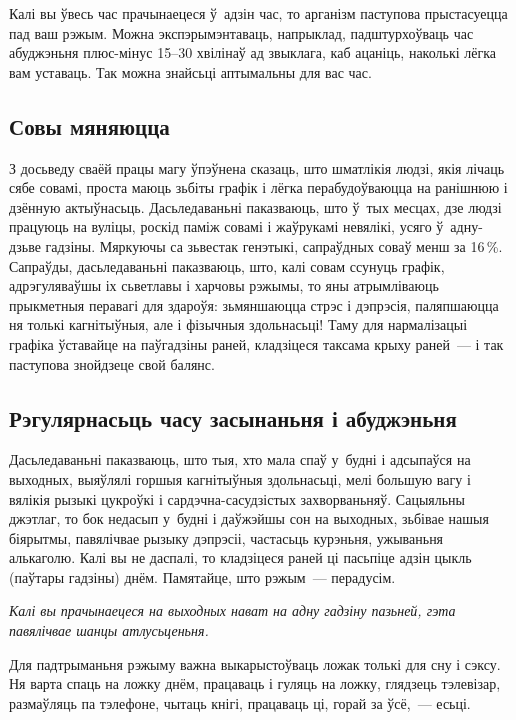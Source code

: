 Калі вы ўвесь час прачынаецеся ў~адзін час, то арганізм паступова прыстасуецца пад ваш рэжым. Можна экспэрымэнтаваць, напрыклад, падштурхоўваць час абуджэньня плюс-мінус 15--30 хвілінаў ад звыклага, каб ацаніць, наколькі лёгка вам уставаць. Так можна знайсьці аптымальны для вас час.

\subsection*{Совы мяняюцца}

З досьведу сваёй працы магу ўпэўнена сказаць, што шматлікія людзі, якія лічаць сябе совамі, проста маюць зьбіты графік і лёгка перабудоўваюцца на ранішнюю і дзённую актыўнасьць. Дасьледаваньні паказваюць, што ў~тых месцах, дзе людзі працуюць на вуліцы, роскід паміж совамі і жаўрукамі невялікі, усяго ў~адну-дзьве гадзіны. Мяркуючы са зьвестак генэтыкі, сапраўдных соваў менш за 16\,\%. Сапраўды, дасьледаваньні паказваюць, што, калі совам ссунуць графік, адрэгуляваўшы іх сьветлавы і харчовы рэжымы, то яны атрымліваюць прыкметныя перавагі для здароўя: зьмяншаюцца стрэс і дэпрэсія, паляпшаюцца ня толькі кагнітыўныя, але і фізычныя здольнасьці! Таму для нармалізацыі графіка ўставайце на паўгадзіны раней, кладзіцеся таксама крыху раней~--- і так паступова знойдзеце свой балянс.


\subsection*{Рэгулярнасьць часу засынаньня і абуджэньня}

Дасьледаваньні паказваюць, што тыя, хто мала спаў у~будні і адсыпаўся на выходных, выяўлялі горшыя кагнітыўныя здольнасьці, мелі большую вагу і вялікія рызыкі цукроўкі і сардэчна-сасудзістых захворваньняў. Сацыяльны джэтлаг, то бок недасып у~будні і даўжэйшы сон на выходных, зьбівае нашыя біярытмы, павялічвае рызыку дэпрэсіі, частасьць курэньня, ужываньня алькаголю. Калі вы не даспалі, то кладзіцеся раней ці пасьпіце адзін цыкль (паўтары гадзіны) днём. Памятайце, што рэжым~--- перадусім. 

\emph{Калі вы прачынаецеся на выходных нават на адну гадзіну пазьней, гэта павялічвае шанцы атлусьценьня.}

Для падтрыманьня рэжыму важна выкарыстоўваць ложак толькі для сну і сэксу. Ня варта спаць на ложку днём, працаваць і гуляць на ложку, глядзець тэлевізар, размаўляць па тэлефоне, чытаць кнігі, працаваць ці, горай за ўсё,~--- есьці. 

